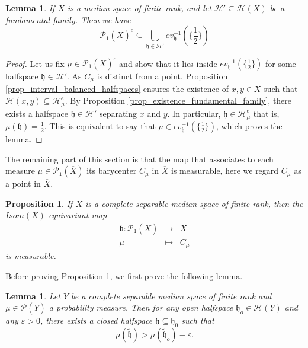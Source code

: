 \documentclass{amsart}
\numberwithin{equation}{section}
\newtheorem{lem}[thm]{Lemma}
\newtheorem{prop}[thm]{Proposition}
\newcommand{\HH}{\mathcal{H}}     %
\newcommand{\hh}{\mathfrak{h}}    %
\newcommand{\bb}{\mathfrak{b}}    %
\newcommand{\PP}{\mathcal{P}}     %
\theoremstyle{definition}
\def\bar{\overline}
\begin{document}
\begin{lem}\label{lem_countable_balanced_halfspaces}
  If $X$ is a median space of finite rank, and let $\HH'\subseteq \HH(X)$ be a fundamental family. Then we have
  \[
  \PP_1(\bar X)^c\subseteq \bigcup_{\hh\in\HH'}ev_\hh^{-1}(\{\frac{1}{2}\})  
 \]
\end{lem}
\begin{proof}
    Let us fix $\mu\in \PP_1(\bar X)^c$ and show that it lies inside $ev_\hh^{-1}(\{\frac{1}{2}\}) $ for some halfspace $\hh\in\HH'$. As $C_\mu$ is distinct from a point, Proposition \ref{prop_interval_balanced_halfspaces} ensures the existence of $x,y\in X$ such that $\HH(x,y)\subseteq \HH_\mu^e$. By Proposition \ref{prop_existence_fundamental_family}, there exists a halfspace $\hh\in\HH'$ separating $x$ and $y$. In particular, $\hh\in\HH_\mu^e$ that is, $\mu(\hh)=\frac{1}{2}$. This is equivalent to say that $\mu\in ev_\hh^{-1}(\{\frac{1}{2}\})$, which proves the lemma.
\end{proof}
The remaining part of this section is that the map that associates to each measure $\mu\in \PP_1(\bar X)$ its barycenter $C_{\mu}$ in $\bar X$ is measurable, here we regard $C_{\mu}$ as a point in $\bar{X}$. 
\begin{prop}\label{prop_measurability_barycenter_map}
If $X$ is a complete separable median space of finite rank, then the $Isom(X)$-equivariant map 
\begin{eqnarray*}
\bb:\PP_1(\bar X)&\rightarrow& \bar X\\
\mu &\mapsto& C_\mu
\end{eqnarray*}
is measurable.
\end{prop}
Before proving Proposition \ref{prop_measurability_barycenter_map}, we first prove the following lemma.
\begin{lem}\label{lem_closed_halfspace_close_to_open_halfspace}
    Let $Y$ be a complete separable median space of finite rank and $\mu\in\PP(\bar{Y})$ a probability measure. Then for any open halfspace $\hh_o\in \HH(Y)$ and any $\varepsilon>0$, there exists a closed halfspace $\hh\subseteq \hh_0$ such that 
    \[
    \mu(\tilde{\hh})>\mu(\tilde{\hh}_o)-\varepsilon . 
    \]
\end{lem}
\end{document}
